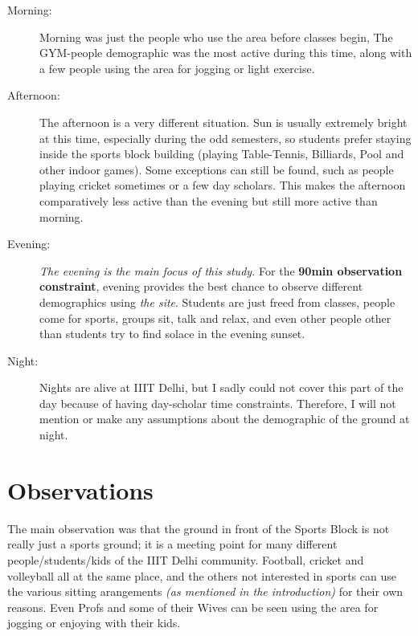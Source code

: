 \documentclass[twocolumn, 12pt]{article}
\begin{document}
\begin{description}


\item[Morning:] Morning was just the people who use the area before classes begin, The GYM-people demographic was the most active during this time, along with a few people using the area for jogging or light exercise.

\item[Afternoon:] The afternoon is a very different situation. Sun is usually extremely bright at this time, especially during the odd semesters, so students prefer staying inside the sports block building (playing Table-Tennis, Billiards, Pool and other indoor games). Some exceptions can still be found, such as people playing cricket sometimes or a few day scholars. This makes the afternoon comparatively less active than the evening but still more active than morning.

\item[Evening:] \textit{The evening is the main focus of this study.} For the \textbf{90min observation constraint}, evening provides the best chance to observe different demographics using \textit{the site}. Students are just freed from classes, people come for sports, groups sit, talk and relax, and even other people other than students try to find solace in the evening sunset.

\item[Night:] Nights are alive at IIIT Delhi, but I sadly could not cover this part of the day because of having day-scholar time constraints. Therefore, I will not mention or make any assumptions about the demographic of the ground at night.

\end{description}

\section{Observations}

The main observation was that the ground in front of the Sports Block 
is not really just a sports ground; it is a meeting point 
for many different people/students/kids of the IIIT Delhi community. 
Football, cricket and volleyball all at the same place, and the others 
not interested in sports can use the various sitting arangements \textit{(as 
mentioned in the introduction)} for their own reasons. 
Even Profs and some of their Wives can be seen using the 
area for jogging or enjoying with their kids.
\end{document}
